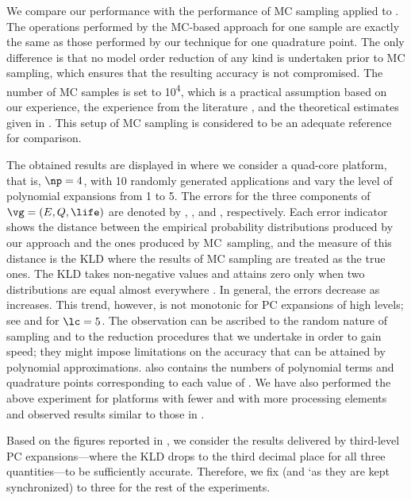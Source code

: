 We compare our performance with the performance of \ac{MC} sampling applied to
. The operations performed by the
\ac{MC}-based approach for one sample are exactly the same as those performed by
our technique for one quadrature point. The only difference is that no model
order reduction of any kind is undertaken prior to \ac{MC} sampling, which
ensures that the resulting accuracy is not compromised. The number of \ac{MC}
samples is set to 10\textsuperscript{4}, which is a practical assumption based
on our experience, the experience from the literature \cite{xiang2010, juan2012,
lee2013}, and the theoretical estimates given in \cite{diaz-emparanza2002}. This
setup of \ac{MC} sampling is considered to be an adequate reference for
comparison.

The obtained results are displayed in  where
we consider a quad-core platform, that is, $\np = 4$, with 10 randomly generated
applications and vary the level of polynomial expansions \lc from 1 to 5. The
errors for the three components of $\vg = (E, Q, \life)$ are denoted by
, , and \error{\life}, respectively. Each error indicator
shows the distance between the empirical probability distributions produced by
our approach and the ones produced by \ac{MC}\ sampling, and the measure of this
distance is the \ac{KLD} \cite{gelman2013, hastie2013} where the results of
\ac{MC} sampling are treated as the true ones. The \ac{KLD} takes non-negative
values and attains zero only when two distributions are equal almost everywhere
\cite{durrett2010}. In general, the errors decrease as \lc increases. This
trend, however, is not monotonic for \ac{PC} expansions of high levels; see
 and \error{\life} for $\lc = 5$. The observation can be ascribed to
the random nature of sampling and to the reduction procedures that we undertake
in order to gain speed; they might impose limitations on the accuracy that can
be attained by polynomial approximations. 
also contains the numbers of polynomial terms \nc and quadrature points \nq
corresponding to each value of \lc. We have also performed the above experiment
for platforms with fewer and with more processing elements and observed results
similar to those in .

Based on the figures reported in , we consider
the results delivered by third-level \ac{PC} expansions---where the \ac{KLD}
drops to the third decimal place for all three quantities---to be sufficiently
accurate. Therefore, we fix \lc (and \lq as they are kept synchronized) to three
for the rest of the experiments.

